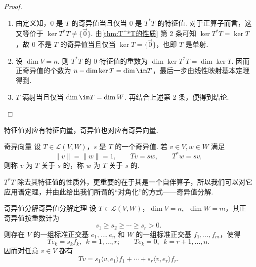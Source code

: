 \begin{proof}
    \begin{enumerate}
        \item 由定义知，$0$ 是 $T$ 的奇异值当且仅当 $0$ 是 $T^*T$ 的特征值. 对于正算子而言，这又等价于 $\ker T^*T \neq \{\vec{0}\}$. 由\autoref{thm:T^*T的性质} 第 2 条可知 $\ker T^*T = \ker T$，故 $0$ 不是 $T$ 的奇异值当且仅当 $\ker T = \{\vec{0}\}$，也即 $T$ 是单射.

        \item 设 $\dim V = n$. 则 $T^*T$ 的 $0$ 特征值的重数为 $\dim \ker T^*T = \dim \ker T$. 因而正奇异值的个数为 $n - \dim \ker T = \dim \im T$，最后一步由线性映射基本定理得到.

        \item $T$ 满射当且仅当 $\dim \im T = \dim W$. 再结合上述第 2 条，便得到结论.
    \end{enumerate}
\end{proof}

特征值对应有特征向量，奇异值也对应有奇异向量.

\begin{definition}{奇异向量}{} 
    设 $T \in \mathcal{L}(V, W)$，$s$ 是 $T$ 的一个奇异值. 若 $v \in V, w \in W$ 满足
    \[
        \lVert v \rVert = \lVert w \rVert = 1,\qquad Tv = sw,\qquad T^*w = sv,
    \]
    则称 $v$ 为 $T$ 关于 $s$ 的，称 $w$ 为 $T$ 关于 $s$ 的.
\end{definition}

$T^*T$ 除去其特征值的性质外，更重要的在于其是一个自伴算子，所以我们可以对它应用谱定理，并由此给出我们所谓的``对角化''的方式——奇异值分解.

\begin{theorem}{奇异值分解}{奇异值分解定理} 
    设 $T \in \mathcal{L}(V, W)$，$\dim V = n,\enspace \dim W = m$，其正奇异值按重数计为
    \[
        s_1 \geqslant s_2 \geqslant \cdots \geqslant s_r > 0.
    \]
    则存在 $V$ 的一组标准正交基 $e_1, \ldots, e_n$ 和 $W$ 的一组标准正交基 $f_1, \ldots, f_m$，使得
    \[
        Te_k = s_k f_k,\enspace k = 1, \ldots, r;\qquad Te_k = 0,\enspace k = r+1, \ldots, n.
    \]
    因而对任意 $v \in V$ 都有
    \[
        Tv = s_1 \langle v, e_1 \rangle f_1 + \cdots + s_r \langle v, e_r \rangle f_r.
    \]
\end{theorem}


